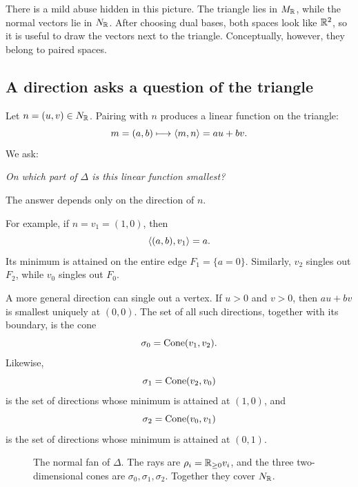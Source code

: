 There is a mild abuse hidden in this picture. The triangle lies in
\(M_{\mathbb{R}}\), while the normal vectors lie in \(N_{\mathbb{R}}\). After
choosing dual bases, both spaces look like \(\mathbb{R}^2\), so it is useful
to draw the vectors next to the triangle. Conceptually, however, they
belong to paired spaces.

\subsection{A direction asks a question of the triangle}

Let \(n=(u,v)\in N_{\mathbb{R}}\). Pairing with \(n\) produces a linear
function on the triangle:
\[
m=(a,b)\longmapsto\left\langle m,n\right\rangle=au+bv.
\]
We ask:

\begin{center}
\emph{On which part of \(\Delta\) is this linear function smallest?}
\end{center}

The answer depends only on the direction of \(n\).

For example, if \(n=v_1=(1,0)\), then
\[
\left\langle (a,b),v_1\right\rangle=a.
\]
Its minimum is attained on the entire edge \(F_1=\{a=0\}\). Similarly,
\(v_2\) singles out \(F_2\), while \(v_0\) singles out \(F_0\).

A more general direction can single out a vertex. If \(u>0\) and
\(v>0\), then \(au+bv\) is smallest uniquely at \((0,0)\). The set of
all such directions, together with its boundary, is the cone
\[
\sigma_0=\operatorname{Cone}(v_1,v_2).
\]
Likewise,
\[
\sigma_1=\operatorname{Cone}(v_2,v_0)
\]
is the set of directions whose minimum is attained at \((1,0)\), and
\[
\sigma_2=\operatorname{Cone}(v_0,v_1)
\]
is the set of directions whose minimum is attained at \((0,1)\).

\begin{figure}[ht]
\centering
{}
\caption{The normal fan of \(\Delta\). The rays are
\(\rho_i=\mathbb{R}_{\geq0}v_i\), and the three two-dimensional cones are
\(\sigma_0,\sigma_1,\sigma_2\). Together they cover \(N_{\mathbb{R}}\).}
\label{fig:p2-normal-fan}
\end{figure}

